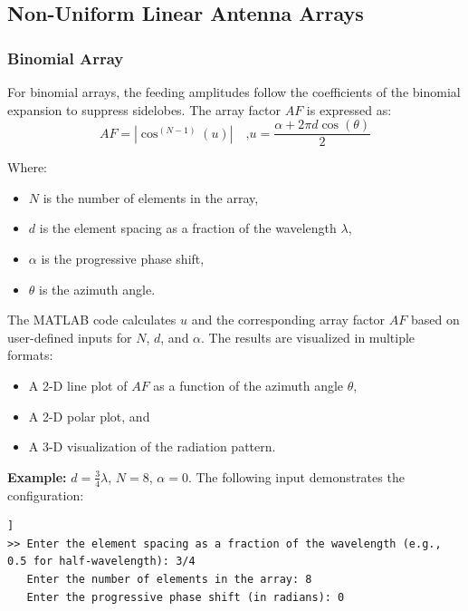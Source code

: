 \documentclass[a4paper, 12pt, english]{article}
\begin{document}
\subsection{Non-Uniform Linear Antenna Arrays} \label{sec:non-uniform linear array}
\subsubsection{Binomial Array} \label{sec:binomial array}


For binomial arrays, the feeding amplitudes follow the coefficients of the binomial expansion to suppress sidelobes. The array factor $ {AF} $ is expressed as:
\[ {{AF} = {\left| \cos ^ {\left( {N} - {1} \right)} {\left( u \right)} \right|}} \quad\mbox{,} {{u} = {\frac{{\alpha} + {2}{\pi}{d}{\cos{\left({\theta}\right)}}}{2}}} \]

\noindent
Where:
\begin{itemize}
    \item $ {N} $ is the number of elements in the array,
    \item $ {d} $ is the element spacing as a fraction of the wavelength $ {\lambda} $,
    \item $ {\alpha} $ is the progressive phase shift,
    \item $ {\theta} $ is the azimuth angle.
\end{itemize}

\noindent
The MATLAB code calculates $ {u} $ and the corresponding array factor $ {AF} $ based on user-defined inputs for $ {N} $, $ {d} $, and $ {\alpha} $. The results are visualized in multiple formats:
\begin{itemize}
    \item A 2-D line plot of $ {AF} $ as a function of the azimuth angle $ {\theta} $,
    \item A 2-D polar plot, and
    \item A 3-D visualization of the radiation pattern.
\end{itemize}

\noindent
\textbf{Example:} $ {d} = {\frac{3}{4}}{\lambda} $, $ {N} = {8} $, $ {\alpha} = {0} $.
\newline
The following input demonstrates the configuration:
\begin{lstlisting}[style=commandstyle,caption=Command line output]]
>> Enter the element spacing as a fraction of the wavelength (e.g., 0.5 for half-wavelength): 3/4
   Enter the number of elements in the array: 8
   Enter the progressive phase shift (in radians): 0
\end{lstlisting}
\end{document}
